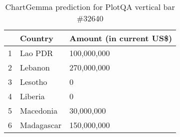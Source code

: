 \begin{table}
    \begin{tabular}{lll}
\toprule
 & Country  & Amount (in current US\$)  \\
\midrule
1 & Lao PDR  & 100,000,000  \\
2 & Lebanon  & 270,000,000  \\
3 & Lesotho  & 0  \\
4 & Liberia  & 0  \\
5 & Macedonia  & 30,000,000  \\
6 & Madagascar  & 150,000,000  \\
\bottomrule
\end{tabular}
    \caption{ChartGemma prediction for PlotQA vertical bar \#32640}
    \label{tab:chartgemma-plotqa-vbar-32640}
\end{table}
